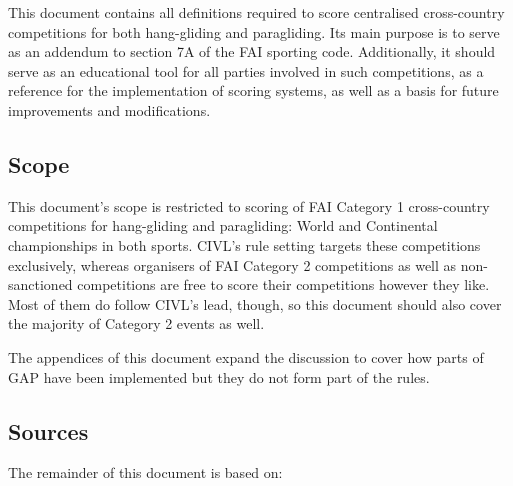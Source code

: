 \documentclass[gap.tex]{subfiles}
\begin{document}
This document contains all definitions required to score centralised
cross-country competitions for both hang-gliding and paragliding. Its main
purpose is to serve as an addendum to section 7A of the FAI sporting code.
Additionally, it should serve as an educational tool for all parties involved
in such competitions, as a reference for the implementation of scoring systems,
as well as a basis for future improvements and modifications.

\subsection{Scope}
This document’s scope is restricted to scoring of FAI Category 1 cross-country
competitions for hang-gliding and paragliding: World and Continental
championships in both sports. CIVL’s rule setting targets these competitions
exclusively, whereas organisers of FAI Category 2 competitions as well as
non-sanctioned competitions are free to score their competitions however they
like. Most of them do follow CIVL’s lead, though, so this document should also
cover the majority of Category 2 events as well.

The appendices of this document expand the discussion to cover how parts of GAP
have been implemented but they do not form part of the rules.

\subsection{Sources}
The remainder of this document is based on:
\end{document}

